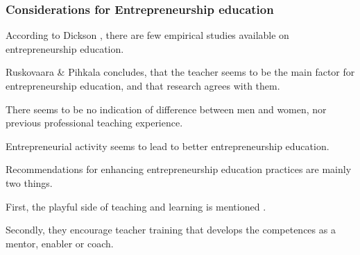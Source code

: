 \subsubsection{Considerations for Entrepreneurship education}

%

%

According to Dickson \cite{dickson}, there are few empirical studies available on entrepreneurship education.

Ruskovaara \& Pihkala \cite{ruskovaara} concludes, that the teacher seems to be the main factor for entrepreneurship education, and that research agrees with them.

There seems to be no indication of difference between men and women, nor previous professional teaching experience.

Entrepreneurial activity seems to lead to better entrepreneurship education.

Recommendations for enhancing entrepreneurship education practices are mainly two things.

First, the playful side of teaching and learning is mentioned \cite{solomon}.

Secondly, they encourage teacher training that develops the competences as a mentor, enabler or coach.
